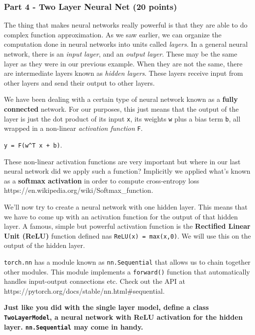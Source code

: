 \documentclass[11pt]{article}
\begin{document}
    \hypertarget{part-4---two-layer-neural-net-20-points}{%
\subsubsection{Part 4 - Two Layer Neural Net (20
points)}\label{part-4---two-layer-neural-net-20-points}}

The thing that makes neural networks really powerful is that they are
able to do complex function approximation. As we saw earlier, we can
organize the computation done in neural networks into units called
\emph{layers}. In a general neural network, there is an \emph{input
layer}, and an \emph{output layer}. These may be the same layer as they
were in our previous example. When they are not the same, there are
intermediate layers known as \emph{hidden layers}. These layers receive
input from other layers and send their output to other layers.

We have been dealing with a certain type of neural network known as a
\textbf{fully connected} network. For our purposes, this just means that
the output of the layer is just the dot product of its input \texttt{x},
its weights \texttt{w} plus a bias term \texttt{b}, all wrapped in a
non-linear \emph{activation function} \texttt{F}.

\texttt{y\ =\ F(w\^{}T\ x\ +\ b)}.

These non-linear activation functions are very important but where in
our last neural network did we apply such a function? Implicitly we
applied what's known as a \textbf{softmax activation} in order to
compute cross-entropy loss
https://en.wikipedia.org/wiki/Softmax\_function.

We'll now try to create a neural network with one hidden layer. This
means that we have to come up with an activation function for the output
of that hidden layer. A famous, simple but powerful activation function
is the \textbf{Rectified Linear Unit (ReLU)} function defined nas
\texttt{ReLU(x)\ =\ max(x,0)}. We will use this on the output of the
hidden layer.

\texttt{torch.nn} has a module known as \texttt{nn.Sequential} that
allows us to chain together other modules. This module implements a
\texttt{forward()} function that automatically handles input-output
connections etc. Check out the API at
https://pytorch.org/docs/stable/nn.html\#sequential.

\textbf{Just like you did with the single layer model, define a class
\texttt{TwoLayerModel}, a neural network with ReLU activation for the
hidden layer. \texttt{nn.Sequential} may come in handy.}
\end{document}
